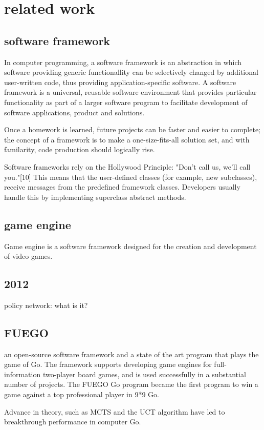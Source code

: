 \section{related work}
\subsection{software framework}
In computer programming, a software framework is an abstraction in which software providing generic functionallity can be selectively changed by additional user-written code, thus providing application-specific software. A software framework is a universal, reusable software environment that provides particular functionality as part of a larger software program to facilitate development of software applications, product and solutions.

Once a homework is learned, future projects can be faster and easier to complete; the concept of a framework is to make a one-size-fits-all solution set, and with familarity, code production should logically rise.

Software frameworks rely on the Hollywood Principle: "Don't call us, we'll call you."[10] This means that the user-defined classes (for example, new subclasses), receive messages from the predefined framework classes. Developers usually handle this by implementing superclass abstract methods.
\subsection{game engine}
Game engine is a software framework designed for the creation and development of video games.

\subsection{2012}
policy network:
what is it?

\subsection{FUEGO}
an open-source software framework and a state of the art program that plays the game of Go. The framework supports developing game engines for full-information two-player board games, and is used successfully in a substantial number of projects. The FUEGO Go program became the first program to win a game against a top professional player in 9*9 Go.

Advance in theory, such as MCTS and the UCT algorithm have led to breakthrough performance in computer Go.

